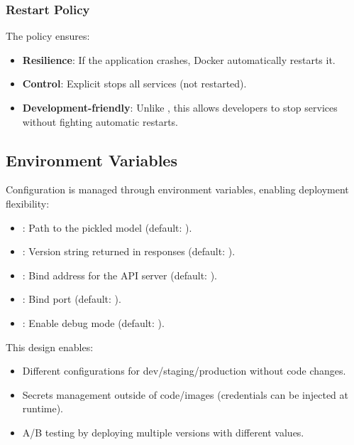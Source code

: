 \subsubsection{Restart Policy}

The  policy ensures:

\begin{itemize}
  \item \textbf{Resilience}: If the application crashes, Docker automatically restarts it.
  
  \item \textbf{Control}: Explicit  stops all services (not restarted).
  
  \item \textbf{Development-friendly}: Unlike , this allows developers to stop 
  services without fighting automatic restarts.
\end{itemize}

\subsection{Environment Variables}

Configuration is managed through environment variables, enabling deployment flexibility:

\begin{itemize}
  \item {}: Path to the pickled model (default: ).
  \item {}: Version string returned in responses (default: ).
  \item {}: Bind address for the API server (default: ).
  \item {}: Bind port (default: ).
  \item {}: Enable debug mode (default: ).
\end{itemize}

This design enables:
\begin{itemize}
  \item Different configurations for dev/staging/production without code changes.
  \item Secrets management outside of code/images (credentials can be injected at runtime).
  \item A/B testing by deploying multiple versions with different  values.
\end{itemize}

